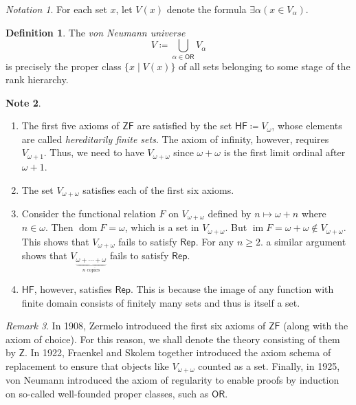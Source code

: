 \documentclass[10pt,letterpaper,cm]{nupset}
\theoremstyle{definition}
\newtheorem{definition}{Definition}[subsection]
\newtheorem{note}[definition]{Note}
\theoremstyle{theorem}
\theoremstyle{remark}
\newtheorem{remark}[definition]{Remark}
\newtheorem*{notation}{Notation}
\newcommand{\1}{\mathbf{1}}
\newcommand{\0}{\vec 0}
\newcommand{\z}{\mathsf{Z}}
\newcommand{\zf}{\mathsf{ZF}}
\newcommand{\ord}{\mathsf{OR}}
\DeclareMathOperator{\im}{im}
\DeclareMathOperator{\dom}{dom}
\begin{document}
 
 \begin{notation}
For each set $x$, let $V(x)$ denote the formula ${\exists \alpha(x\in V_{\alpha})}$.
\end{notation}

\begin{definition}
The \textit{von Neumann universe} $$V \coloneqq \bigcup_{\alpha \in \ord}V_{\alpha}$$ is precisely the proper class $ \{x \mid V(x)\}$ of all sets  belonging to some stage of the rank hierarchy. 
\end{definition}
 
 \begin{note} $ $
 \begin{enumerate}
 \item The first five axioms  of $\zf$ are satisfied by the set $\mathsf{HF}\coloneqq V_{\omega}$, whose elements are called \textit{hereditarily finite sets}. The axiom of infinity, however, requires $V_{\omega +1}$. Thus, we need to have $V_{\omega + \omega}$ since $\omega + \omega$ is the first limit ordinal after $\omega +1$.
 \item The set $V_{\omega +\omega}$ satisfies each of the first six axioms. 
 \item Consider the functional relation $F$ on $V_{\omega +\omega}$ defined by $n \mapsto \omega + n$ where $n \in \omega$. Then $\dom{F} = \omega$, which is a set in $V_{\omega +\omega}$. But $\im{F} = \omega + \omega \notin V_{\omega + \omega}$. This shows that $V_{\omega +\omega}$ fails to satisfy $\mathsf{Rep}$. For any $n\geq 2$. a similar argument shows that $V_{\underbrace{\omega + \cdots + \omega}_{n \text{ copies}}}$ fails to satisfy $\mathsf{Rep}$.
 \item $\mathsf{HF}$, however, satisfies  $\mathsf{Rep}$. This is because the image of any function  with  finite domain consists of finitely many sets and thus is itself a set. 
 \end{enumerate}
\end{note}

 \begin{remark} 
In 1908, Zermelo introduced the first six axioms of $\zf$ (along with the axiom of choice). For this reason, we shall denote the theory consisting of them by $\z$. In  1922, Fraenkel and Skolem together introduced the axiom schema of replacement to ensure that objects like $V_{\omega + \omega}$ counted as a set. Finally, in 1925, von Neumann  introduced the axiom of regularity to enable proofs by induction on so-called well-founded proper classes, such as $\ord$.
\end{remark}
\end{document}
